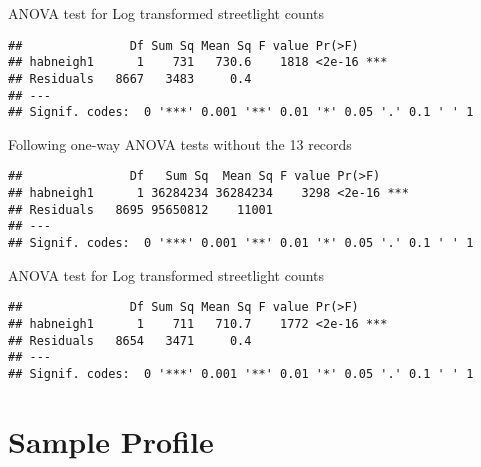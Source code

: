 \documentclass[
]{book}
\begin{document}
ANOVA test for Log transformed streetlight counts

\begin{verbatim}
##               Df Sum Sq Mean Sq F value Pr(>F)    
## habneigh1      1    731   730.6    1818 <2e-16 ***
## Residuals   8667   3483     0.4                   
## ---
## Signif. codes:  0 '***' 0.001 '**' 0.01 '*' 0.05 '.' 0.1 ' ' 1
\end{verbatim}

Following one-way ANOVA tests without the 13 records

\begin{verbatim}
##               Df   Sum Sq  Mean Sq F value Pr(>F)    
## habneigh1      1 36284234 36284234    3298 <2e-16 ***
## Residuals   8695 95650812    11001                   
## ---
## Signif. codes:  0 '***' 0.001 '**' 0.01 '*' 0.05 '.' 0.1 ' ' 1
\end{verbatim}

ANOVA test for Log transformed streetlight counts

\begin{verbatim}
##               Df Sum Sq Mean Sq F value Pr(>F)    
## habneigh1      1    711   710.7    1772 <2e-16 ***
## Residuals   8654   3471     0.4                   
## ---
## Signif. codes:  0 '***' 0.001 '**' 0.01 '*' 0.05 '.' 0.1 ' ' 1
\end{verbatim}

\hypertarget{sample-profile}{%
\chapter{Sample Profile}\label{sample-profile}}
\end{document}
